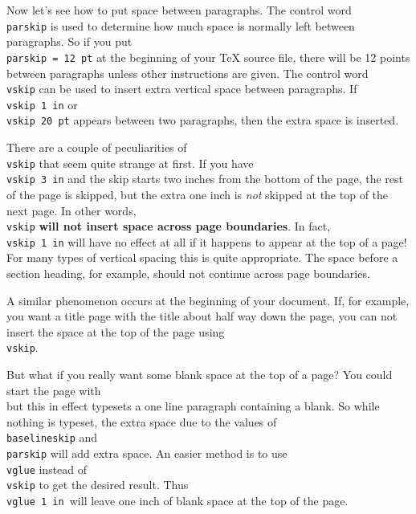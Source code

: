 Now let's see how to put space between paragraphs.  The control 
word {\tt \\parskip} is used to determine how much space is 
normally left between paragraphs. So if you put {\tt \\parskip = 
12 pt} at the beginning of your \TeX{} source file, there will be 
12 points between paragraphs unless other instructions are 
given. The control word {\tt \\vskip} can be used to insert extra 
vertical space between paragraphs.  If {\tt \\vskip 1 in} or {\tt 
\\vskip 20 pt} appears between two paragraphs, then the extra 
space is inserted. 

There are a couple of peculiarities of {\tt \\vskip} that seem 
quite strange at first.  If you have {\tt \\vskip 3 in} and the 
skip starts two inches from the bottom of the page, the rest of 
the page is skipped, but the extra one inch is {\it not\/} 
skipped at the top of the next page.  In other words, {\tt \\vskip} 
{\bf will not insert space across page boundaries}.  In 
fact, {\tt \\vskip~1~in} will have no effect at all if it happens 
to appear at the top of a page! For many types of vertical 
spacing this is quite appropriate.  The space before a section 
heading, for example, should not continue across page boundaries. 

A similar phenomenon occurs at the beginning of your document. 
If, for example, you want a title page with the title about half 
way down the page, you can not insert the space at the top of the 
page using {\tt \\vskip}. 

But what if you really want some blank space at the top of a 
page? You could start the page with {\tt\\\sp} but this in effect 
typesets a one line paragraph containing a blank. So while 
nothing is typeset, the extra space due to the values of {\tt 
\\baselineskip} and {\tt \\parskip} will add extra space. An easier 
method is to use {\tt \\vglue} instead of {\tt \\vskip} to get 
the desired result.  Thus {\tt \\vglue 1 in\ }will leave one inch 
of blank space at the top of the page. 


